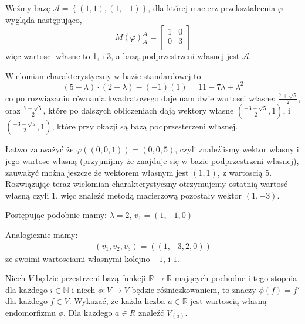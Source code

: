 \documentclass[11pt]{scrartcl}
\begin{document}
    \begin{walk}
        \item Weźmy bazę $\mathcal{A}  = \left \{ \left ( 1, 1 \right ), \left ( 1, -1 \right ) \right \}$, dla której macierz przekształcenia $\varphi$ wygląda następująco, 
          \[
            M \left ( \varphi \right )^{\mathcal{A} }_{\mathcal{A} } = 
            \begin{bmatrix}
                1 & 0 \\
                0 & 3 \\
            \end{bmatrix}
          \]
          więc wartosci własne to 1, i 3, a bazą podprzestrzeni własnej jest $\mathcal{A} $.
        \item Wielomian charakterystyczny w bazie standardowej to 
          \[
              \left ( 5 - \lambda \right ) \cdot \left ( 2 - \lambda \right ) - \left ( -1 \right )\left ( 1 \right ) = 11 - 7 \lambda + \lambda^2
          \]
          co po rozwiązaniu równania kwadratowego daje nam dwie wartosci własne: $\frac{7 + \sqrt{5} }{2}$, oraz $\frac{7 - \sqrt{5} }{2}$, które po dalszych obliczeniach dają wektory własne $\left ( \frac{-3 + \sqrt{5} }{2}, 1 \right )$, i $\left ( \frac{-3 - \sqrt{5} }{2}, 1 \right )$, które przy okazji są bazą podprzesterzeni własnej.
        \item Łatwo zauważyć że $\varphi \left ( \left ( 0, 0, 1 \right ) \right ) = \left ( 0, 0, 5 \right )$, czyli znaleźlismy wektor własny i jego wartosc własną (przyjmijmy że znajduje się w bazie podprzestrzeni własnej), zauważyć można jeszcze że wektorem własnym jest $\left ( 1,1 \right )$, z wartoscią 5. Rozwiązując teraz wielomian charakterystyczny otrzymujemy ostatnią wartosć własną czyli $1$, więc znaleźć metodą macierzową pozostały wektor $\left ( 1, -3 \right )$.
        \item Postępując podobnie mamy: $\lambda = 2$, $v_{1} = \left ( 1, -1, 0 \right ) $
        \item Analogicznie mamy:
          \begin{gather*}
            \left ( v_{1}, v_{2}, v_{3} \right ) = \left ( \left ( 1, -3, 2, 0 \right ) \right )
          \end{gather*}
          ze swoimi wartosciami własnymi kolejno $-1$, i $1$.
    \end{walk}
    
   \begin{zadanie}
        Niech $V$ będzie przestrzeni bazą funkcji $\mathbb{R}  \to \mathbb{R} $ mających pochodne i-tego stopnia dla każdego $i \in \mathbb{N} $ i niech $\phi : V \to V$ będzie różniczkowaniem, to znaczy $\phi \left ( f \right ) = f'$ dla każdego $f \in V$. Wykazać, że każda liczba $a \in \mathbb{R} $ jest wartoscią własną endomorfizmu $\phi $. Dla każdego $a \in R$ znaleźć $V_{(a)}$.
   \end{zadanie}
    
\end{document}
